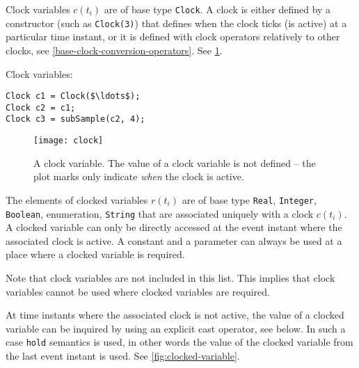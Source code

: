 \begin{definition}
Clock variables $c(t_{i})$ are of base type \lstinline!Clock!.
A clock is either defined by a constructor (such as \lstinline!Clock(3)!) that defines when the clock ticks (is active) at a particular time instant, or it is defined with clock operators relatively to other clocks, see \cref{base-clock-conversion-operators}.
See \cref{fig:clock-variable}.
\end{definition}

\begin{example}
Clock variables:
\begin{lstlisting}[language=modelica]
Clock c1 = Clock($\ldots$);
Clock c2 = c1;
Clock c3 = subSample(c2, 4);
\end{lstlisting}
\end{example}

\begin{figure}[H]
  \begin{center}
    \texttt{[image: clock]}
  \end{center}
  \caption{A clock variable.  The value of a clock variable is not defined -- the plot marks only indicate \emph{when} the clock is active.}\label{fig:clock-variable}
\end{figure}

\begin{definition}\label{def:clocked-variable}
The elements of clocked variables $r(t_{i})$ are of base type \lstinline!Real!, \lstinline!Integer!, \lstinline!Boolean!, enumeration, \lstinline!String! that are associated uniquely with
a clock $c(t_{i})$. A clocked variable can only be directly accessed at the event instant where the associated clock is active.  A constant and a parameter can always be used at a place
where a clocked variable is required.
\begin{nonnormative}
Note that clock variables are not included in this list.
This implies that clock variables cannot be used where clocked variables are required.
\end{nonnormative}

At time instants where the associated clock is not active, the value of a clocked variable can be inquired by using an explicit cast operator, see below.  In such a case \lstinline!hold! semantics is
used, in other words the value of the clocked variable from the last event instant is used.  See \cref{fig:clocked-variable}.
\end{definition}

